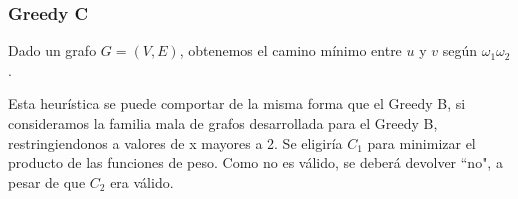 \clearpage
\subsubsection{Greedy C}\label{subsubsec:greedy-c}
Dado un grafo $G = (V,E)$, obtenemos el camino m\'inimo entre $u$ y $v$ seg\'un $\omega_1\omega_2$. 

Esta heurística se puede comportar de la misma forma que el Greedy B, si consideramos la familia mala de grafos desarrollada para el Greedy B,
restringiendonos a valores de x mayores a 2. Se eligiría $C_1$  para minimizar el producto de las funciones de peso. Como no es válido,
se deberá devolver ``no", a pesar de que $C_2$ era válido. 
